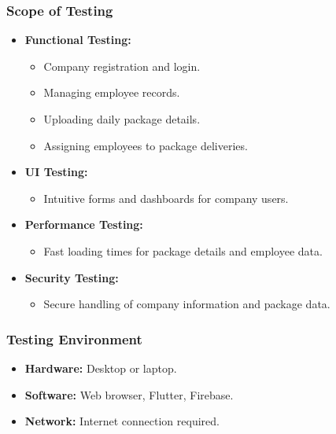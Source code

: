 \documentclass{article}
\begin{document}
\subsubsection{Scope of Testing}
\begin{itemize}
    \item \textbf{Functional Testing:}
    \begin{itemize}
        \item Company registration and login.
        \item Managing employee records.
        \item Uploading daily package details.
        \item Assigning employees to package deliveries.
    \end{itemize}
    \item \textbf{UI Testing:}
    \begin{itemize}
        \item Intuitive forms and dashboards for company users.
    \end{itemize}
    \item \textbf{Performance Testing:}
    \begin{itemize}
        \item Fast loading times for package details and employee data.
    \end{itemize}
    \item \textbf{Security Testing:}
    \begin{itemize}
        \item Secure handling of company information and package data.
    \end{itemize}
\end{itemize}

\subsubsection{Testing Environment}
\begin{itemize}
    \item \textbf{Hardware:} Desktop or laptop.
    \item \textbf{Software:} Web browser, Flutter, Firebase.
    \item \textbf{Network:} Internet connection required.
\end{itemize}
\end{document}

